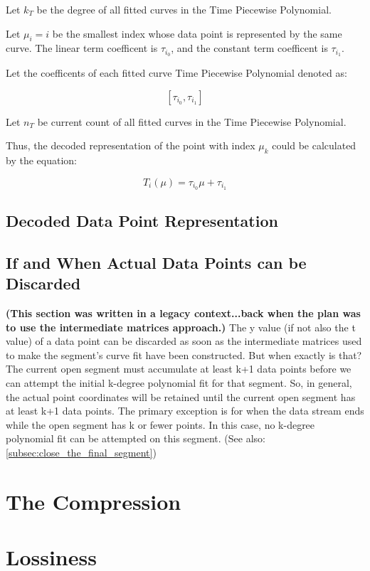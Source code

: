 \documentclass{article}
\begin{document}
Let \(k_T\) be the degree of all fitted curves in the Time Piecewise Polynomial.

Let \(\mu_i = i\) be the smallest index whose data point is represented by the same curve. The linear term coefficent is \(\tau_{i_{0}}\), and the constant term coefficent is \(\tau_{i_{1}}\).

Let the coefficents of each fitted curve Time Piecewise Polynomial denoted as:

\[ [ \tau_{i_{0}}, \tau_{i_{1}} ] \]



Let \(n_T\) be current count of all fitted curves in the Time Piecewise Polynomial.

 Thus, the decoded representation of the point with index \(\mu_k\) could be calculated by the equation:

\[ T_i(\mu) = \tau_{i_{0}}\mu + \tau_{i_{1}} \]


\subsection{Decoded Data Point Representation}

\subsection{If and When Actual Data Points can be Discarded}
\label{subsec:when_can_discard_point_coords}
\textbf{(This section was written in a legacy context...back when the plan was to use the intermediate matrices approach.)}
The y value (if not also the t value) of a data point can be discarded as soon as the intermediate matrices used to make the segment’s curve fit have been constructed. But when exactly is that? The current open segment must accumulate at least k+1 data points before we can attempt the initial k-degree polynomial fit for that segment. So, in general, the actual point coordinates will be retained until the current open segment has at least k+1 data points. The primary exception is for when the data stream ends while the open segment has k or fewer points. In this case, no k-degree polynomial fit can be attempted on this segment. (See also: \ref{subsec:close_the_final_segment})




\section{The Compression}


\section{Lossiness}
\end{document}
